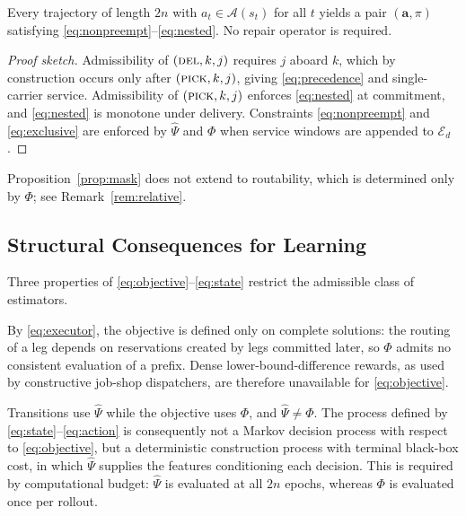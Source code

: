 \begin{proposition}
\label{prop:mask}
Every trajectory of length $2n$ with $a_t\in\mathcal{A}(s_t)$ for all $t$
yields a pair $(\bm{a},\pi)$ satisfying
\eqref{eq:nonpreempt}--\eqref{eq:nested}. No repair operator is required.
\end{proposition}

\begin{proof}[Proof sketch]
Admissibility of $(\textsc{del},k,j)$ requires $j$ aboard $k$, which by
construction occurs only after $(\textsc{pick},k,j)$, giving
\eqref{eq:precedence} and single-carrier service. Admissibility of
$(\textsc{pick},k,j)$ enforces \eqref{eq:nested} at commitment, and
\eqref{eq:nested} is monotone under delivery. Constraints
\eqref{eq:nonpreempt} and \eqref{eq:exclusive} are enforced by $\hat{\Psi}$
and $\Phi$ when service windows are appended to $\mathcal{E}_d$.
\end{proof}

Proposition~\ref{prop:mask} does not extend to routability, which is
determined only by $\Phi$; see Remark~\ref{rem:relative}.

\subsection{Structural Consequences for Learning}
\label{sec:consequences}

Three properties of \eqref{eq:objective}--\eqref{eq:state} restrict the
admissible class of estimators.

\begin{remark}
\label{rem:noreward}
By \eqref{eq:executor}, the objective is defined only on complete solutions:
the routing of a leg depends on reservations created by legs committed
later, so $\Phi$ admits no consistent evaluation of a prefix. Dense
lower-bound-difference rewards, as used by constructive job-shop
dispatchers, are therefore unavailable for \eqref{eq:objective}.
\end{remark}

\begin{remark}
\label{rem:surrogate}
Transitions use $\hat{\Psi}$ while the objective uses $\Phi$, and
$\hat{\Psi}\neq\Phi$. The process defined by
\eqref{eq:state}--\eqref{eq:action} is consequently not a Markov decision
process with respect to \eqref{eq:objective}, but a deterministic
construction process with terminal black-box cost, in which $\hat{\Psi}$
supplies the features conditioning each decision. This is required by
computational budget: $\hat{\Psi}$ is evaluated at all $2n$ epochs, whereas
$\Phi$ is evaluated once per rollout.
\end{remark}

